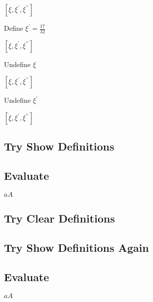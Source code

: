 \documentclass{article}
\begin{document}
$\left[ \xi ,\xi ^{\prime },\xi ^{\prime \prime }\right] $

Define $\xi ^{\prime }=\frac{17}{32}$

$\left[ \xi ,\xi ^{\prime },\xi ^{\prime \prime }\right] $

Undefine $\xi $

$\left[ \xi ,\xi ^{\prime },\xi ^{\prime \prime }\right] $

Undefine $\xi ^{\prime }$

$\left[ \xi ,\xi ^{\prime },\xi ^{\prime \prime }\right] $

\subsection{Try Show Definitions}

\subsection{Evaluate}

$aA$

\subsection{Try Clear Definitions}

\subsection{Try Show Definitions Again}

\subsection{Evaluate}

$aA$
\end{document}
